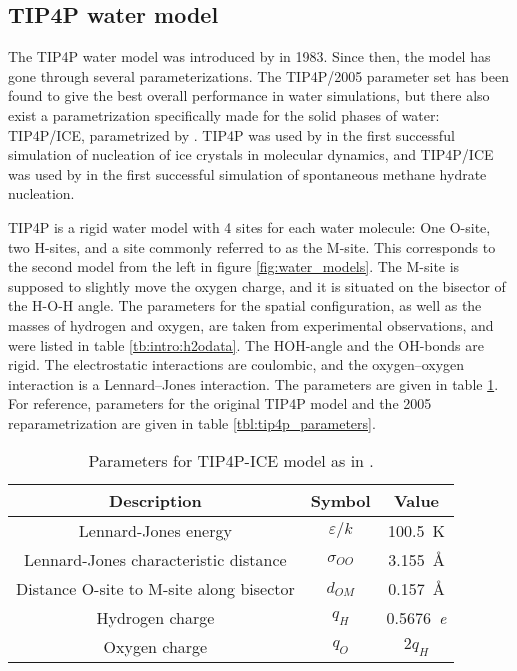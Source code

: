 \subsection{TIP4P water model}
The TIP4P water model was introduced by \citet{Jorgensen1983} in 1983. Since then, the model has gone through several parameterizations. The TIP4P/2005 parameter set has been found to give the best overall performance in water simulations, but there also exist a parametrization specifically made for the solid phases of water: TIP4P/ICE, parametrized by \citet{Abascal2005}. TIP4P was used by \citet{Matsumoto2002} in the first successful simulation of nucleation of ice crystals in molecular dynamics, and TIP4P/ICE was used by \citet{Walsh2009} in the first successful simulation of spontaneous methane hydrate nucleation. 

TIP4P is a rigid water model with 4 sites for each water molecule: One O-site, two H-sites, and a site commonly referred to as the M-site. This corresponds to the second model from the left in figure \ref{fig:water_models}. The M-site is supposed to slightly move the oxygen charge, and it is situated on the bisector of the H-O-H angle. The parameters for the spatial configuration, as well as the masses of hydrogen and oxygen, are taken from experimental observations, and were listed in table \ref{tb:intro:h2odata}. The HOH-angle and the OH-bonds are rigid. The electrostatic interactions are coulombic, and the oxygen--oxygen interaction is a Lennard--Jones interaction. The parameters are given in table \ref{tbl:tip4p_ice}. For reference, parameters for the original TIP4P model and the 2005 reparametrization are given in table \ref{tbl:tip4p_parameters}.

\begin{table}[h!tb]
\caption{Parameters for TIP4P-ICE model as in \cite{Abascal2005}.}
\label{tbl:tip4p_ice}
\begin{center}
\begin{tabular}{c|c|c}
Description & Symbol & Value \\ 
\hline
Lennard-Jones energy & $\varepsilon/k$ & \SI{100.5}{\kelvin} \\
Lennard-Jones characteristic distance & $\sigma_{OO}$ & \SI{3.155}{\angstrom} \\
Distance O-site to M-site along bisector & $d_{OM}$ & \SI{0.157}{\angstrom} \\
Hydrogen charge & $q_H$ & \SI{0.5676}{\elementarycharge} \\
Oxygen charge & $q_O$ & $2q_H$ 
\end{tabular}
\end{center}
\end{table}

